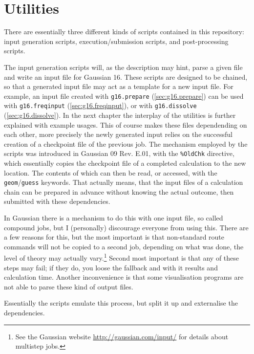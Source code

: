 \documentclass[   %
  final,          %
  a4paper         %
]{article}
\begin{document}
\section{Utilities}
\label{sec:utilities}

There are essentially three different kinds of scripts contained in this repository:
input generation scripts, execution/submission scripts, and post-processing scripts.

The input generation scripts will, as the description may hint,
parse a given file and write an input file for Gaussian 16.
These scripts are designed to be chained, 
so that a generated input file may act as a template for a new input file. 
For example, an input file created with \lstinline`g16.prepare` (\ref{sec:g16.prepare})
can be used with \lstinline`g16.freqinput` (\ref{sec:g16.freqinput}), or
with \lstinline`g16.dissolve` (\ref{sec:g16.dissolve}).
In the next chapter the interplay of the utilities is further explained with example usages.
This of course makes these files dependending on each other,
more precisely the newly generated input relies on the successful creation
of a checkpoint file of the previous job.
The mechanism employed by the scripts was introduced in Gaussian 09 Rev. E.01,
with the \texttt{\%OldChk} directive, which essentially copies the checkpoint file
of a completed calculation to the new location.
The contents of which can then be read, or accessed, with the \texttt{geom}/\texttt{guess} keywords.
That actually means, that the input files of a calculation chain can be
prepared in advance without knowing the actual outcome,
then submitted with these dependencies.

In Gaussian there is a mechanism to do this with one input file,
so called compound jobs, but I (personally) discourage everyone from using this.
There are a few reasons for this, but the most important is that non-standard 
route commands will not be copied to a second job,
depending on what was done, the level of theory may actually vary.\footnote{%
  See the Gaussian website 
  \href{http://gaussian.com/input/?tabid=1}{http://gaussian.com/input/}
  for details about multistep jobs.}
Second most important is that any of these steps may fail;
if they do, you loose the fallback and with it results and calculation time.
Another inconvenience is that some visualisation programs are not able to
parse these kind of output files.

Essentially the scripts emulate this process, but split it up and externalise the dependencies.
\end{document}
